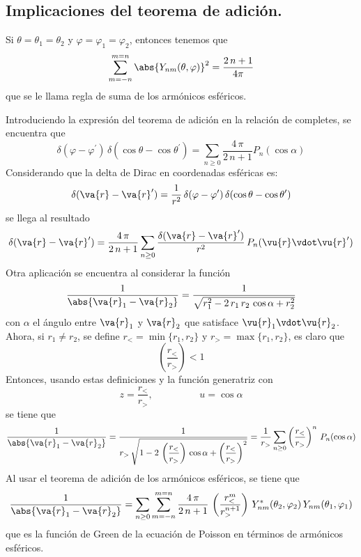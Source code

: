 \subsection*{Implicaciones del teorema de adición.}
Si $\theta = \theta_{1} = \theta_{2}$ y $\varphi = \varphi_{1} = \varphi_{2}$, entonces tenemos que
\[ \sum_{m=-n}^{m=n} \abs{Y_{nm}(\theta, \varphi)}^{2} = \dfrac{2 \, n + 1}{4 \pi} \]
que se le llama regla de suma de los armónicos esféricos.
\par
Introduciendo la expresión del teorema de adición en la relación de completes, se encuentra que
\[ \delta (\varphi - \varphi^{\prime}) \, \delta (\cos \theta - \cos \theta^{\prime}) = \sum_{n\geq 0} \dfrac{4 \, \pi}{2 \, n + 1} P_{n} (\cos \alpha) \]
Considerando que la delta de Dirac en coordenadas esféricas es:
\[ \delta (\va{r} - \va{r}^{\prime}) = \dfrac{1}{r^{2}} \, \delta (\varphi - \varphi^{\prime}) \, \delta (\cos \theta - \cos \theta^{\prime}) \]
se llega al resultado
\[ \delta (\va{r} - \va{r}^{\prime}) = \dfrac{4 \, \pi}{2 \, n + 1} \sum_{n \geq 0} \dfrac{\delta (\va{r} - \va{r}^{\prime})}{r^{2}} \, P_{n} (\vu{r} \vdot \vu{r}^{\prime}) \]
Otra aplicación se encuentra al considerar la función
\[ \dfrac{1}{\abs{\va{r}_{1} - \va{r}_{2}}} = \dfrac{1}{\sqrt{r_{1}^{2} - 2 \, r_{1} \, r_{2} \, \cos \alpha + r_{2}^{2}}} \]
con $\alpha$ el ángulo entre $\va{r}_{1}$ y $\va{r}_{2}$ que satisface $\vu{r}_{1} \vdot \vu{r}_{2}$. Ahora, si $r_{1} \neq r_{2}$, se define $r_{<} = \min \{r_{1}, r_{2} \}$ y $r_{>} = \max \{r_{1}, r_{2} \}$, es claro que
\[ \left( \dfrac{r_{<}}{r_{>}} \right) < 1 \]
Entonces, usando estas definiciones y la función generatriz con
\[ z = \dfrac{r_{<}}{r_{>}}, \hspace{2cm} u = \cos \alpha \]
se tiene que
\[ \dfrac{1}{\abs{\va{r}_{1} - \va{r}_{2}}} =  \dfrac{1}{r_{>} \, \sqrt{1 - 2 \, \left( \dfrac{r_{<}}{r_{>}} \right) \, \cos \alpha + \left( \dfrac{r_{<}}{r_{>}} \right)^{2}}} = \dfrac{1}{r_{>}} \sum_{n \geq 0} \left( \dfrac{r_{<}}{r_{>}} \right)^{n} \, P_{n} (\cos \alpha) \]
Al usar el teorema de adición de los armónicos esféricos, se tiene que
\[ \dfrac{1}{\abs{\va{r}_{1} - \va{r}_{2}}} = \sum_{n \geq 0} \sum_{m=-n}^{m=n} \dfrac{4 \, \pi}{2 \, n + 1} \, \left( \dfrac{r_{<}^{m}}{r_{>}^{n+1}} \right) \, Y_{nm}^{*} (\theta_{2}, \varphi_{2}) \, Y_{nm} (\theta_{1}, \varphi_{1}) \]
que es la función de Green de la ecuación de Poisson en términos de armónicos esféricos.
